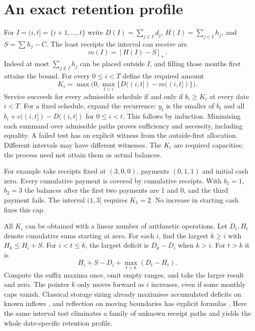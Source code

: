 \documentclass[11pt]{article}
\begin{document}
\section{An exact retention profile}
For $I=(i,t]=\{i+1,\ldots,t\}$ write $D(I)=\sum_{j\in I}d_j$, $H(I)=\sum_{j\in I}h_j$, and $S=\sum h_j-C$. The least receipts the interval can receive are
\[
 m(I)=[H(I)-S]_+ .
\]
Indeed at most $\sum_{j\notin I}h_j$ can be placed outside $I$, and filling those months first attains the bound. For every $0\le i<T$ define the required amount
\[
 K_i=\max\bigl(0,\max_{t>i}\{D((i,t])-m((i,t])\}\bigr).
\]
Service succeeds for every admissible schedule if and only if $b_i\ge K_i$ at every date $i<T$. For a fixed schedule, expand the recurrence: $y_t$ is the smaller of $b_t$ and all $b_i+c((i,t])-D((i,t])$ for $0\le i<t$. This follows by induction. Minimising each summand over admissible paths proves sufficiency and necessity, including equality. A failed test has an explicit witness from the outside-first allocation. Different intervals may have different witnesses. The $K_i$ are required capacities; the process need not attain them as actual balances.

For example take receipts fixed at $(3,0,0)$, payments $(0,1,1)$ and initial cash zero. Every cumulative payment is covered by cumulative receipts. With $b_1=1$, $b_2=3$ the balances after the first two payments are 1 and 0, and the third payment fails. The interval $(1,3]$ requires $K_1=2$. No increase in starting cash fixes this cap.

All $K_i$ can be obtained with a linear number of arithmetic operations. Let $D_t,H_t$ denote cumulative sums starting at zero. For each $i$, find the largest $k\ge i$ with $H_k\le H_i+S$. For $i<t\le k$, the largest deficit is $D_k-D_i$ when $k>i$. For $t>k$ it is
\[
 H_i+S-D_i+\max_{t>k}(D_t-H_t).
\]
Compute the suffix maxima once, omit empty ranges, and take the larger result and zero. The pointer $k$ only moves forward as $i$ increases, even if some monthly caps vanish. Classical storage sizing already maximises accumulated deficits on known inflows \cite{reservoir}, and reflection on moving boundaries has explicit formulas \cite{reflection}. Here the same interval test eliminates a family of unknown receipt paths and yields the whole date-specific retention profile.
\end{document}
